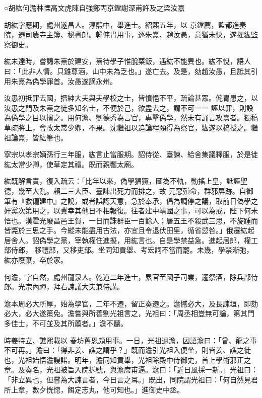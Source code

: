 
\begin{pinyinscope}

 ○胡紘何澹林慄高文虎陳自強鄭丙京鏜謝深甫許及之梁汝嘉



 胡紘字應期，處州遂昌人。淳熙中，舉進士。紹熙五年，以
 京鏜薦，監都進奏院，遷司農寺主簿、秘書郎。韓侂胄用事，逐朱熹、趙汝愚，意猶未快，遂擢紘監察御史。



 紘未達時，嘗謁朱熹於建安，熹待學子惟脫粟飯，遇紘不能異也。紘不悅，語人曰：「此非人情。只雞尊酒，山中未為乏也。」遂亡去。及是，劾趙汝愚，且詆其引用朱熹為偽學罪首。汝愚遂謫永州。



 汝愚初抵罪去國，搢紳大夫與夫學校之士，皆憤悒不平，疏論甚眾。侂胄患之，以汝愚之門及朱熹之徒多知名士，不便於己，欲盡去之，謂不可一一
 誣以罪，則設為偽學之目以擯之。用何澹、劉德秀為言官，專擊偽學，然未有誦言攻熹者。獨稿草疏將上，會改太常少卿，不果。沈繼祖以追論程頤得為察官，紘遂以槁授之。繼祖論熹，皆紘筆也。



 寧宗以孝宗嫡孫行三年服，紘言止當服期。詔侍從、臺諫、給舍集議釋服，於是徙紘太常少卿，使草定其禮。既而親饗太廟。



 紘既解言責，復入疏云：「比年以來，偽學猖獗，圖為不軌，動搖上皇，詆誣聖德，幾至大亂。賴二三大臣、臺諫出死力而排之，故
 元惡殞命，群邪屏跡。自御筆有『救偏建中』之說，或者誤認天意，急於奉承，倡為調停之議，取前日偽學之奸黨次第用之，以冀幸其他日不相報復。往者建中靖國之事，可以為戒，陛下何未悟也。漢霍光廢昌邑王賀，一日而誅群臣一百餘人；唐五王不殺武三思，不旋踵而皆斃於三思之手。今縱未能盡用古法，亦宜且令退伏田里，循省愆咎。」俄遷紘起居舍人。詔偽學之黨，宰執權住進擬，用紘言也。自是學禁益急。進起居郎，權工部侍郎，
 移禮部，又移吏部。坐同知貢舉、考宏詞不當而罷。未幾，學禁漸弛，紘亦廢棄，卒於家。



 何澹，字自然，處州龍泉人。乾道二年進士，累官至國子司業，遷祭酒，除兵部侍郎。光宗內禪，拜右諫議大夫兼侍講。



 澹本周必大所厚，始為學官，二年不遷，留正奏遷之。澹憾必大，及長諫垣，即劾必大，必大遂策免。澹嘗與所善劉光祖言之，光祖曰：「周丞相豈無可論，第其門多佳士，不可並及其所薦者。」澹不聽。



 時姜特立、譙熙載以
 春坊舊恩頗用事。一日，光祖過澹，因語澹曰：「曾、龍之事不可再。」澹曰：「得非姜、譙之謂乎？」既而澹引光祖入便坐，則皆姜、譙之徒也，光祖始悟澹謾諾。明年，澹同知貢舉，光祖除殿中侍御史，首上學術邪正之章。及奏名，光祖被旨入院拆號，與澹席甫逼。澹曰：「近日風採一新。」光祖曰：「非立異也，但嘗為大諫言者，今日言之耳。」既出，同院謂光祖曰：「何自然見君所上章，數夕恍惚，餌定志丸，他可知也。」進御史中丞。




\end{pinyinscope}
